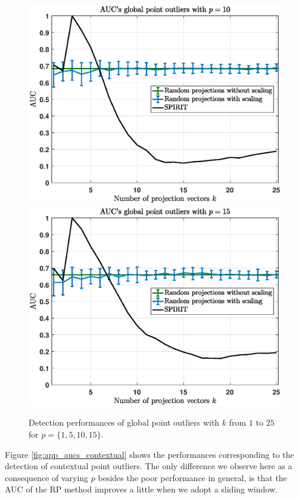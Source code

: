 \begin{figure}[h]\ContinuedFloat
	\centering
	\includegraphics[scale=0.36]{analysis/AUCs_point2}
	\includegraphics[scale=0.36]{analysis/AUCs_point3}
	\caption{Detection performances of global point outliers with $k$ from $1$ to $25$ for $p=\{1,5,10,15\}$.}
	\label{fig:app_aucs_point}
\end{figure}

\newpage
Figure \ref{fig:app_aucs_contextual} shows the performances corresponding to the detection of contextual point outliers. The only difference we observe here as a consequence of varying $p$ besides the poor performance in general, is that the AUC of the RP method improves a little when we adopt a sliding window.

